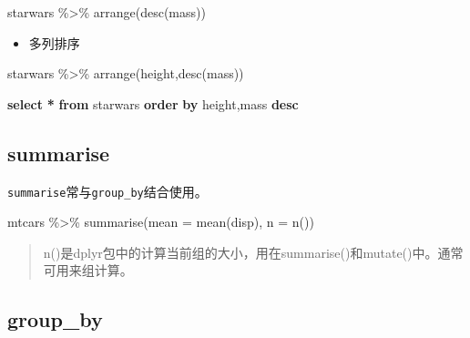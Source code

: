\documentclass[
]{book}
\newenvironment{Shaded}{\begin{snugshade}}{\end{snugshade}}
\newcommand{\AttributeTok}[1]{\textcolor[rgb]{0.77,0.63,0.00}{#1}}
\newcommand{\FunctionTok}[1]{\textcolor[rgb]{0.00,0.00,0.00}{#1}}
\newcommand{\KeywordTok}[1]{\textcolor[rgb]{0.13,0.29,0.53}{\textbf{#1}}}
\newcommand{\NormalTok}[1]{#1}
\newcommand{\OperatorTok}[1]{\textcolor[rgb]{0.81,0.36,0.00}{\textbf{#1}}}
\newcommand{\SpecialCharTok}[1]{\textcolor[rgb]{0.00,0.00,0.00}{#1}}
\providecommand{\tightlist}{%
  \setlength{\itemsep}{0pt}\setlength{\parskip}{0pt}}
\begin{document}
\begin{Shaded}
\begin{Highlighting}[]
\NormalTok{starwars }\SpecialCharTok{\%\textgreater{}\%} 
  \FunctionTok{arrange}\NormalTok{(}\FunctionTok{desc}\NormalTok{(mass))}
\end{Highlighting}
\end{Shaded}

\begin{itemize}
\tightlist
\item
  多列排序
\end{itemize}

\begin{Shaded}
\begin{Highlighting}[]
\NormalTok{starwars }\SpecialCharTok{\%\textgreater{}\%} 
  \FunctionTok{arrange}\NormalTok{(height,}\FunctionTok{desc}\NormalTok{(mass))}
\end{Highlighting}
\end{Shaded}

\begin{Shaded}
\begin{Highlighting}[]
\KeywordTok{select} \OperatorTok{*} \KeywordTok{from}\NormalTok{ starwars }\KeywordTok{order} \KeywordTok{by}\NormalTok{ height,mass }\KeywordTok{desc}
\end{Highlighting}
\end{Shaded}

\hypertarget{dplyr-summarise}{%
\subsection{summarise}\label{dplyr-summarise}}

\texttt{summarise}常与\texttt{group\_by}结合使用。

\begin{Shaded}
\begin{Highlighting}[]
\NormalTok{mtcars }\SpecialCharTok{\%\textgreater{}\%}
  \FunctionTok{summarise}\NormalTok{(}\AttributeTok{mean =} \FunctionTok{mean}\NormalTok{(disp), }\AttributeTok{n =} \FunctionTok{n}\NormalTok{())}
\end{Highlighting}
\end{Shaded}

\begin{quote}
n()是dplyr包中的计算当前组的大小，用在summarise()和mutate()中。通常可用来组计算。
\end{quote}

\hypertarget{dplyr-groupby}{%
\subsection{group\_by}\label{dplyr-groupby}}
\end{document}
